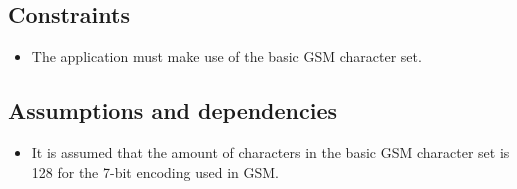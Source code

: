 \subsection{Constraints}
\begin{itemize}
\item The application must make use of the basic GSM character set.
\end{itemize}



\subsection{Assumptions and dependencies}

\begin{itemize}
\item It is assumed that the amount of characters in the basic GSM character set is 128 for the 7-bit encoding used in GSM.
\end{itemize}
